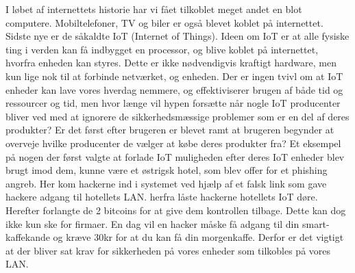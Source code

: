     I løbet af internettets historie har vi fået tilkoblet meget andet en blot computere. Mobiltelefoner, TV og biler er også blevet koblet på internettet. Sidste nye er de såkaldte IoT (Internet of Things). Ideen om IoT er at alle fysiske ting i verden kan få indbygget en processor, og blive koblet på internettet, hvorfra enheden kan styres. Dette er ikke nødvendigvis kraftigt hardware, men kun lige nok til at forbinde netværket, og enheden. Der er ingen tvivl om at IoT enheder kan lave vores hverdag nemmere, og effektiviserer brugen af både tid og ressourcer og tid, men hvor længe vil hypen forsætte når nogle IoT producenter bliver ved med at ignorere de sikkerhedsmæssige problemer som er en del af deres produkter? Er det først efter brugeren er blevet ramt at brugeren begynder at overveje hvilke producenter de vælger at købe deres produkter fra? Et eksempel på nogen der først valgte at forlade IoT muligheden efter deres IoT enheder blev brugt imod dem, kunne være et østrigsk hotel, som blev offer for et \gls{phishing} angreb. Her kom hackerne ind i systemet ved hjælp af et falsk link som gave hackere adgang til hotellets LAN. herfra låste hackerne hotellets IoT døre. Herefter forlangte de 2 bitcoins for at give dem kontrollen tilbage. Dette kan dog ikke kun ske for firmaer. En dag vil en hacker måske få adgang til din smart-kaffekande og kræve 30kr for at du kan få din morgenkaffe. Derfor er det vigtigt at der bliver sat krav for sikkerheden på vores enheder som tilkobles på vores LAN.\\
   
    


\newpage